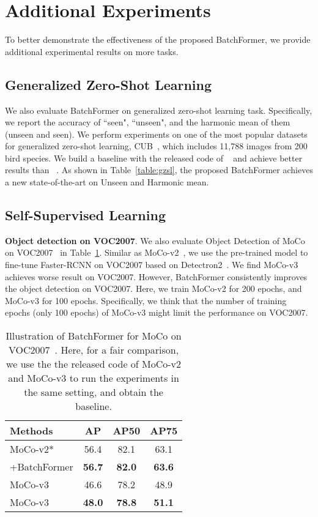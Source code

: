 \documentclass[10pt,twocolumn,letterpaper]{article}
\begin{document}
\section{Additional Experiments}
To better demonstrate the effectiveness of the proposed BatchFormer, we provide additional experimental results on more tasks.

\subsection{Generalized Zero-Shot Learning}

We also evaluate BatchFormer on generalized zero-shot learning task. Specifically, we report the accuracy of ``seen",  ``unseen", and  the harmonic mean of them (unseen and seen). We perform experiments on one of the most popular datasets for generalized zero-shot learning, CUB~\cite{wah2011caltech}, which includes 11,788 images from 200 bird species. We build a baseline with the released code of ~\cite{wang2021contrastive} and achieve better results than ~\cite{wang2021contrastive}. As shown in Table~\ref{table:gzsl}, the proposed BatchFormer achieves a new state-of-the-art on Unseen and Harmonic mean.






\subsection{Self-Supervised Learning}

{\bf Object detection on VOC2007}. We also evaluate Object Detection of MoCo on VOC2007~\cite{everingham2010pascal} in Table~\ref{table:moco_det}. Similar as MoCo-v2~\cite{chen2020mocov2}, we use the pre-trained model to fine-tune Faster-RCNN on VOC2007 based on Detectron2~\cite{wu2019detectron2}. We find MoCo-v3 achieves worse result on VOC2007. However, BatchFormer consistently improves the object detection on VOC2007. Here, we train MoCo-v2 for 200 epochs, and MoCo-v3 for 100 epochs. Specifically, we think that the number of training epochs (only 100 epochs) of MoCo-v3 might limit the performance on VOC2007.


\begin{table}[tp]
\small
\caption{Illustration of BatchFormer for MoCo on VOC2007~\cite{everingham2010pascal}. Here, for a fair comparison, we use the the released code of MoCo-v2 and MoCo-v3 to run the experiments in the same setting, and obtain the baseline.}
\label{table:moco_det}
\centering
\begin{tabular}{@{}lccc@{}}
\hline
Methods & AP & AP50 & AP75 \\
\hline
MoCo-v2*~\cite{chen2020mocov2} & 56.4 & 82.1 & 63.1\\
+BatchFormer & {\bf 56.7} & {\bf 82.0} & {\bf 63.6}\\
\hline
MoCo-v3~\cite{chen2020mocov2} & 46.6 & 78.2 & 48.9\\
MoCo-v3~\cite{chen2020mocov2} & {\bf 48.0} & {\bf 78.8} & {\bf 51.1}\\
\hline
\end{tabular}
\end{table}
\end{document}

